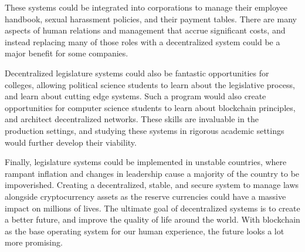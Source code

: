 \documentclass[letterpaper,twocolumn]{article}
\begin{document}
These systems could be integrated into corporations to manage their employee handbook, sexual harassment policies, and their payment tables.  There are many aspects of human relations and management that accrue significant costs, and instead replacing many of those roles with a decentralized system could be a major benefit for some companies.

Decentralized legislature systems could also be fantastic opportunities for colleges, allowing political science students to learn about the legislative process, and learn about cutting edge systems.  Such a program would also create opportunities for computer science students to learn about blockchain principles, and architect decentralized networks.  These skills are invaluable in the production settings, and studying these systems in rigorous academic settings would further develop their viability.

Finally, legislature systems could be implemented in unstable countries, where rampant inflation and changes in leadership cause a majority of the country to be impoverished.  Creating a decentralized, stable, and secure system to manage laws alongside cryptocurrency assets as the reserve currencies could have a massive impact on millions of lives.  The ultimate goal of decentralized systems is to create a better future, and improve the quality of life around the world.  With blockchain as the base operating system for our human experience, the future looks a lot more promising.

\vspace{1 cm}
\printbibliography
\end{document}

